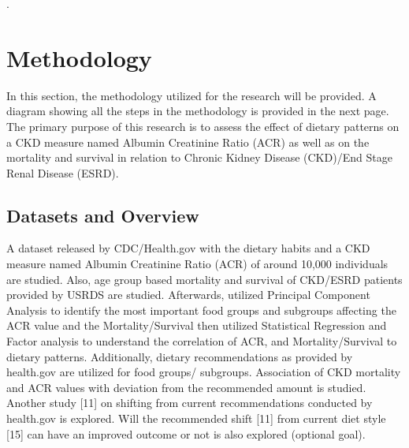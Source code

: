 \newcommand{\specialcell}[2][l]{%
\begin{tabular}[#1]{@{}l@{}}#2\end{tabular}}
    .
\section{Methodology}
In this section, the methodology utilized for the research will be provided. A diagram showing all the steps in the methodology is provided in the next page. The primary purpose of this research is to assess the effect of dietary patterns on a CKD measure named Albumin Creatinine Ratio (ACR) as well as on the mortality and survival in relation to Chronic Kidney Disease (CKD)/End Stage Renal Disease (ESRD). 

\subsection{Datasets and Overview}
A dataset  released by CDC/Health.gov with the  dietary habits and a CKD measure  named Albumin Creatinine Ratio (ACR)  of around 10,000 individuals are studied.  Also, age group based mortality and  survival of CKD/ESRD patients provided  by USRDS are studied. Afterwards,  utilized Principal Component Analysis to  identify the most important food groups  and subgroups affecting the ACR value  and the Mortality/Survival then utilized  Statistical Regression and Factor analysis  to understand the correlation of ACR, and  Mortality/Survival to dietary patterns. Additionally, dietary recommendations as provided by health.gov are utilized for food groups/ subgroups. Association of CKD mortality and ACR values with deviation from the recommended amount is studied. Another study [11] on shifting from current recommendations conducted by health.gov is explored. Will the recommended shift [11] from current diet style [15] can have an improved outcome or not is also explored (optional goal).  

